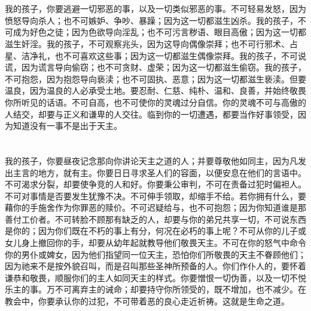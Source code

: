 
\section{}

我的孩子，你要逃避一切邪恶的事，以及一切类似邪恶的事。不可轻易发怒，因为愤怒导向杀人；也不可嫉妒、争吵、暴躁；因为这一切都滋生凶杀。我的孩子，不可成为好色之徒；因为色欲导向淫乱；也不可污言秽语、眼目高傲；因为这一切都滋生奸淫。我的孩子，不可观察兆头，因为这导向偶像崇拜；也不可行邪术、占星、洁净礼，也不可喜欢这些事；因为这一切都滋生偶像崇拜。我的孩子，不可说谎，因为谎言导向偷窃；也不可贪财、虚荣；因为这一切都滋生偷窃。我的孩子，不可抱怨，因为抱怨导向亵渎；也不可固执、恶意；因为这一切都滋生亵渎。但要温良，因为温良的人必承受土地。要忍耐、仁慈、纯朴、温和、良善，并始终敬畏你所听见的话语。不可自高，也不可使你的灵魂过分自信。你的灵魂不可与高傲的人结交，却要与正义和谦卑的人交往。临到你的一切遭遇，都要当作好事领受，因为知道没有一事不是出于天主。\par


\section{}

我的孩子，你要昼夜记念那向你讲论天主之道的人；并要尊敬他如同主，因为凡发出主言的地方，就有主。你要日日寻求圣人们的容面，以便安息在他们的言语中。不可渴求分裂，却要使争竞的人和好。你要秉公审判，不可在责备过犯时偏袒人。不可对事情是否要发生犹豫不决。不可伸手领取，却缩手不给。若你拥有什么，要藉你的手施舍作为你罪恶的赎价。不可迟疑给与，也不可抱怨；因为你知道谁是那善付工价者。不可转脸不顾那有缺乏的人，却要与你的弟兄共享一切，不可说东西是你的；因为你们既在不朽的事上有分，何况在必朽的事上呢？不可从你的儿子或女儿身上撤回你的手，却要从幼年起就教导他们敬畏天主。不可在你的怒气中命令你的男仆或婢女，因为他们指望同一位天主，恐怕你们所敬畏的天主不眷顾他们；因为祂来不是按外貌召叫，而是召叫那些圣神所预备的人。你们作仆人的，要怀着谦恭和敬畏，顺服你们的主人如同天主的样式。你要憎恨一切伪善，以及一切不悦乐主的事。万不可离弃主的诫命；却要持守你所领受的，既不增加，也不减少。在教会中，你要承认你的过犯，不可带着恶的良心走近祈祷。这就是生命之道。\par

